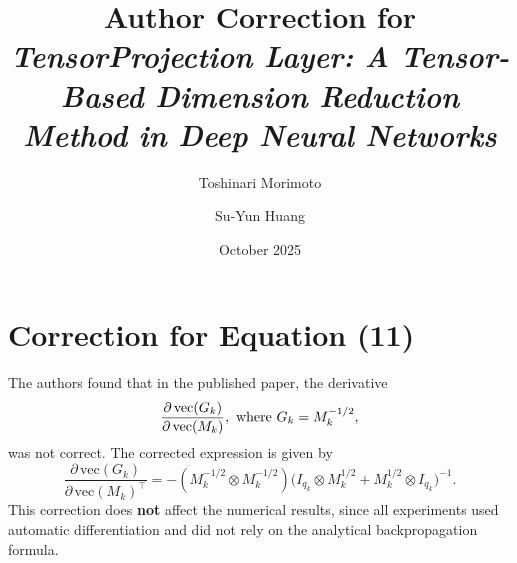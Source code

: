 \documentclass[10pt]{article}
\title{\textbf{Author Correction for}\\[3pt]
\emph{TensorProjection Layer: A Tensor-Based Dimension Reduction Method in Deep Neural Networks}}
\author{Toshinari Morimoto \and Su-Yun Huang}
\date{October 2025}
\begin{document}
\maketitle

\section*{Correction for Equation (11)}

The authors found that in the published paper, the derivative
\[
\frac{\partial\,\mathrm{vec}(G_k)}{\partial\,\mathrm{vec}(M_k)}, ~{\rm where}~ G_k = M_k^{-1/2},
\]
was not correct. 
The corrected expression is given by
\[
\boxed{
\displaystyle
\frac{\partial\,\mathrm{vec}(G_k)}{\partial\,\mathrm{vec}(M_k)^{\!\top}}
= - (M_k^{-1/2} \otimes M_k^{-1/2})
\bigl(I_{q_k} \otimes M_k^{1/2} + M_k^{1/2} \otimes I_{q_k}\bigr)^{-1}.
}
\tag{1}
\]
This correction does \textbf{not} affect the numerical results,
since all experiments used automatic differentiation
and did not rely on the analytical backpropagation formula.
\end{document}
